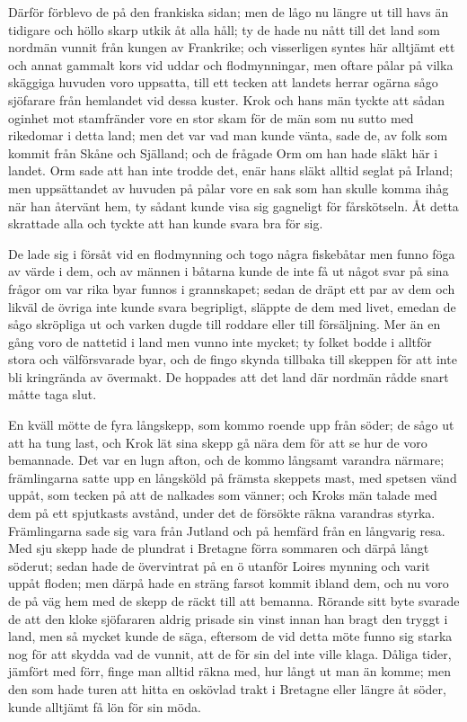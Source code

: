 \initial Därför förblevo de på den frankiska sidan; men de lågo nu längre ut till havs än tidigare och höllo skarp utkik åt alla håll; ty de hade nu nått till det land som nordmän vunnit från kungen av Frankrike; och visserligen syntes här alltjämt ett och annat gammalt kors vid uddar och flodmynningar, men oftare pålar på vilka skäggiga huvuden voro uppsatta, till ett tecken att landets herrar ogärna sågo sjöfarare från hemlandet vid dessa kuster. Krok och hans män tyckte att sådan oginhet mot stamfränder vore en stor skam för de män som nu sutto med rikedomar i detta land; men det var vad man kunde vänta, sade de, av folk som kommit från Skåne och Själland; och de frågade Orm om han hade släkt här i landet. Orm sade att han inte trodde det, enär hans släkt alltid seglat på Irland; men uppsättandet av huvuden på pålar vore en sak som han skulle komma ihåg när han återvänt hem, ty sådant kunde visa sig gagneligt för fårskötseln. Åt detta skrattade alla och tyckte att han kunde svara bra för sig.

\initial De lade sig i försåt vid en flodmynning och togo några fiskebåtar men funno föga av värde i dem, och av männen i båtarna kunde de inte få ut något svar på sina frågor om var rika byar funnos i grannskapet; sedan de dräpt ett par av dem och likväl de övriga inte kunde svara begripligt, släppte de dem med livet, emedan de sågo skröpliga ut och varken dugde till roddare eller till försäljning. Mer än en gång voro de nattetid i land men vunno inte mycket; ty folket bodde i alltför stora och välförsvarade byar, och de fingo skynda tillbaka till skeppen för att inte bli kringrända av övermakt. De hoppades att det land där nordmän rådde snart måtte taga slut.

\initial En kväll mötte de fyra långskepp, som kommo roende upp från söder; de sågo ut att ha tung last, och Krok lät sina skepp gå nära dem för att se hur de voro bemannade. Det var en lugn afton, och de kommo långsamt varandra närmare; främlingarna satte upp en långsköld på främsta skeppets mast, med spetsen vänd uppåt, som tecken på att de nalkades som vänner; och Kroks män talade med dem på ett spjutkasts avstånd, under det de försökte räkna varandras styrka. Främlingarna sade sig vara från Jutland och på hemfärd från en långvarig resa. Med sju skepp hade de plundrat i Bretagne förra sommaren och därpå långt söderut; sedan hade de övervintrat på en ö utanför Loires mynning och varit uppåt floden; men därpå hade en sträng farsot kommit ibland dem, och nu voro de på väg hem med de skepp de räckt till att bemanna. Rörande sitt byte svarade de att den kloke sjöfararen aldrig prisade sin vinst innan han bragt den tryggt i land, men så mycket kunde de säga, eftersom de vid detta möte funno sig starka nog för att skydda vad de vunnit, att de för sin del inte ville klaga. Dåliga tider, jämfört med förr, finge man alltid räkna med, hur långt ut man än komme; men den som hade turen att hitta en oskövlad trakt i Bretagne eller längre åt söder, kunde alltjämt få lön för sin möda.

